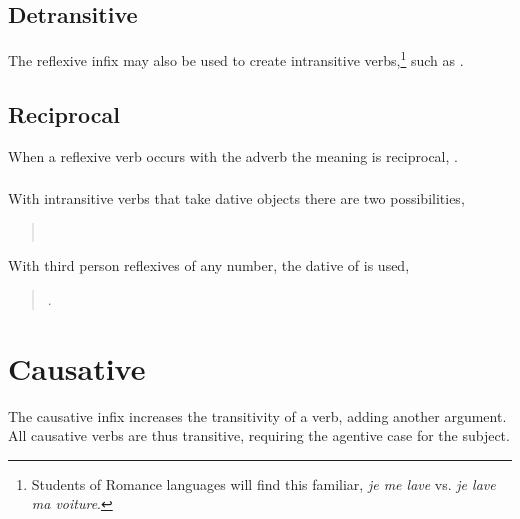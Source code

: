 \begin{quotation}
\noindent{} 
\end{quotation} 
\noindent {}

\subsection{Detransitive} The reflexive infix may also be used to
create intransitive verbs,\footnote{Students of Romance languages will
find this familiar, \textit{je me lave} vs. \textit{je lave ma
voiture}.} such as  .

\subsection{Reciprocal} When a reflexive verb occurs with the adverb
  the meaning is reciprocal,  .

\subsubsection{} With intransitive verbs that take dative objects
there are two possibilities,

\begin{quotation}
\noindent{}  \\
\noindent{} 
\end{quotation}

\noindent With third person reflexives of any number, the dative of
 is used,

\begin{quotation}
\noindent{} .
\end{quotation}

\noindent {}

\section{Causative}
\noindent The causative infix  increases the transitivity
of a verb, adding another argument.  All causative verbs are thus
transitive, requiring the agentive case for the subject.
\label{syn:causative}

